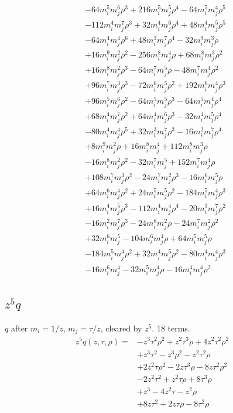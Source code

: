 {\begin{align*}
&-64m_i^{5} m_j^{6} \rho^{3}+216m_i^{5} m_j^{5} \rho^{4}-64m_i^{5} m_j^{4} \rho^{5}\\
&-112m_i^{4} m_j^{7} \rho^{3}+32m_i^{4} m_j^{6} \rho^{4}+48m_i^{4} m_j^{5} \rho^{5}\\
&-64m_i^{4} m_j^{4} \rho^{6}+48m_i^{3} m_j^{7} \rho^{4}-32m_i^{9} m_j^{3} \rho\\
&+16m_i^{9} m_j^{2} \rho^{2}-256m_i^{8} m_j^{4} \rho+68m_i^{8} m_j^{3} \rho^{2}\\
&+16m_i^{8} m_j^{2} \rho^{3}-64m_i^{7} m_j^{5} \rho-48m_i^{7} m_j^{4} \rho^{2}\\
&+96m_i^{7} m_j^{3} \rho^{3}-72m_i^{6} m_j^{5} \rho^{2}+192m_i^{6} m_j^{4} \rho^{3}\\
&+96m_i^{5} m_j^{6} \rho^{2}-64m_i^{5} m_j^{5} \rho^{3}-64m_i^{5} m_j^{4} \rho^{4}\\
&+68m_i^{4} m_j^{7} \rho^{2}+64m_i^{4} m_j^{6} \rho^{3}-32m_i^{4} m_j^{5} \rho^{4}\\
&-80m_i^{4} m_j^{4} \rho^{5}+32m_i^{3} m_j^{7} \rho^{3}-16m_i^{2} m_j^{7} \rho^{4}\\
&+8m_i^{9} m_j^{2} \rho+16m_i^{8} m_j^{4}+112m_i^{8} m_j^{3} \rho\\
&-16m_i^{8} m_j^{2} \rho^{2}-32m_i^{7} m_j^{5}+152m_i^{7} m_j^{4} \rho\\
&+108m_i^{7} m_j^{3} \rho^{2}-24m_i^{7} m_j^{2} \rho^{3}-16m_i^{6} m_j^{5} \rho\\
&+64m_i^{6} m_j^{4} \rho^{2}+24m_i^{5} m_j^{5} \rho^{2}-184m_i^{5} m_j^{4} \rho^{3}\\
&+16m_i^{4} m_j^{5} \rho^{3}-112m_i^{4} m_j^{4} \rho^{4}-20m_i^{3} m_j^{7} \rho^{2}\\
&-16m_i^{2} m_j^{7} \rho^{3}-24m_i^{8} m_j^{2} \rho-24m_i^{7} m_j^{2} \rho^{2}\\
&+32m_i^{6} m_j^{5}-104m_i^{6} m_j^{4} \rho+64m_i^{5} m_j^{5} \rho\\
&-184m_i^{5} m_j^{4} \rho^{2}+32m_i^{4} m_j^{5} \rho^{2}-80m_i^{4} m_j^{4} \rho^{3}\\
&-16m_i^{6} m_j^{4}-32m_i^{5} m_j^{4} \rho-16m_i^{4} m_j^{4} \rho^{2}
\end{align*}
}

\subsection*{$z^5q$}
$q$ after $m_i=1/z$, $m_j=\tau/z$, cleared by $z^5$. 18 terms.
{\small
\begin{align*}
z^5q(z,\tau,\rho)={}&-z^{3} \tau^{2} \rho^{2}+z^{2} \tau^{3} \rho+4z^{2} \tau^{2} \rho^{2}\\
&+z^{3} \tau^{2}-z^{3} \rho^{2}-z^{2} \tau^{2} \rho\\
&+2z^{2} \tau \rho^{2}-2z \tau^{3} \rho-8z \tau^{2} \rho^{2}\\
&-2z^{2} \tau^{2}+z^{2} \tau \rho+8\tau^{3} \rho\\
&+z^{3}-4z^{2} \tau-z^{2} \rho\\
&+8z \tau^{2}+2z \tau \rho-8\tau^{2} \rho
\end{align*}
}

